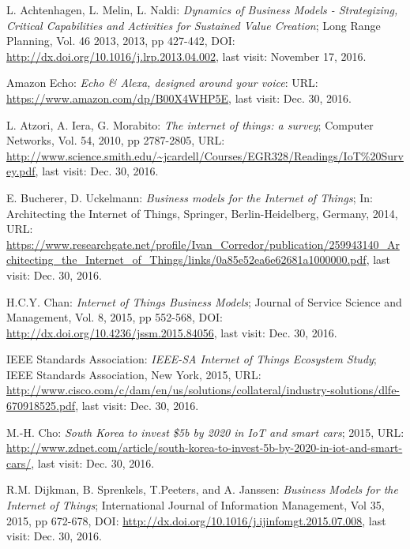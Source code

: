  \begin{thebibliography}{99}
 	\vspace{-3em}
  \setlength{\parskip}{1pt}
  \setlength{\itemsep}{1pt plus 0.3ex}
     L. Achtenhagen, L. Melin, L. Naldi: \emph{Dynamics of Business Models - Strategizing, Critical Capabilities and Activities for Sustained Value Creation}; Long Range Planning, Vol. 46 2013, 2013, pp 427-442, DOI: \url{http://dx.doi.org/10.1016/j.lrp.2013.04.002},  last visit: November 17, 2016.
	
	 Amazon Echo: \emph{Echo \& Alexa, designed around your voice}: URL: \url{https://www.amazon.com/dp/B00X4WHP5E}, last visit: Dec. 30, 2016.

	 L. Atzori, A. Iera, G. Morabito: \emph{The internet of things: a survey}; Computer Networks, Vol. 54, 2010, pp 2787-2805, URL: \url{http://www.science.smith.edu/~jcardell/Courses/EGR328/Readings/IoT%20Survey.pdf}, last visit: Dec. 30, 2016.

	 E. Bucherer, D. Uckelmann: \emph{Business models for the Internet of Things}; In: Architecting the Internet of Things, Springer, Berlin-Heidelberg, Germany, 2014, URL: \url{https://www.researchgate.net/profile/Ivan_Corredor/publication/259943140_Architecting_the_Internet_of_Things/links/0a85e52ea6e62681a1000000.pdf}, last visit: Dec. 30, 2016.

	 H.C.Y. Chan: \emph{Internet of Things Business Models}; Journal of Service Science and Management, Vol. 8, 2015, pp 552-568, DOI: \url{http://dx.doi.org/10.4236/jssm.2015.84056}, last visit: Dec. 30, 2016.

	 IEEE Standards Association: \emph{IEEE-SA Internet of Things Ecosystem Study}; IEEE Standards Association, New York, 2015, URL: \url{http://www.cisco.com/c/dam/en/us/solutions/collateral/industry-solutions/dlfe-670918525.pdf}, last visit: Dec. 30, 2016.

	 M.-H. Cho: \emph{South Korea to invest \$5b by 2020 in IoT and smart cars}; 2015, URL: \url{http://www.zdnet.com/article/south-korea-to-invest-5b-by-2020-in-iot-and-smart-cars/}, last visit: Dec. 30, 2016.

	 R.M. Dijkman, B. Sprenkels, T.Peeters, and A. Janssen: \emph{Business Models for the Internet of Things}; International Journal of Information Management, Vol 35, 2015, pp 672-678, DOI: \url{http://dx.doi.org/10.1016/j.ijinfomgt.2015.07.008}, last visit: Dec. 30, 2016.


\end{thebibliography}
